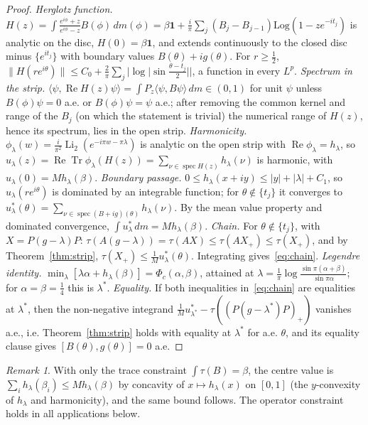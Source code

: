 \documentclass[11pt]{amsart}
\theoremstyle{definition}
\theoremstyle{remark}
\newtheorem{remark}[theorem]{Remark}
\numberwithin{equation}{section}
\newcommand{\Tr}{\operatorname{Tr}}
\newcommand{\spec}{\operatorname{spec}}
\newcommand{\Li}{\operatorname{Li}_2}
\newcommand{\one}{\mathbf{1}}
\renewcommand{\Re}{\operatorname{Re}}
\begin{document}
\begin{proof}
\emph{Herglotz function.} $H(z)=\int\frac{e^{i\phi}+z}{e^{i\phi}-z}B(\phi)\,dm(\phi)=\beta\one+\frac i\pi\sum_j(B_j-B_{j-1})
\mathrm{Log}(1-ze^{-it_j})$ is analytic on the disc, $H(0)=\beta\one$, and extends continuously to the closed disc minus
$\{e^{it_j}\}$ with boundary values $B(\theta)+ig(\theta)$. For $r\ge\frac12$,
$\|H(re^{i\theta})\|\le C_0+\frac2\pi\sum_j|\log|\sin\frac{\theta-t_j}2||$, a function in every $L^p$.
\emph{Spectrum in the strip.} $\langle\psi,\Re H(z)\psi\rangle=\int P_z\langle\psi,B\psi\rangle\,dm\in(0,1)$ for unit $\psi$
unless $B(\phi)\psi=0$ a.e. or $B(\phi)\psi=\psi$ a.e.; after removing the common kernel and range of the $B_j$ (on which
the statement is trivial) the numerical range of $H(z)$, hence its spectrum, lies in the open strip.
\emph{Harmonicity.} $\phi_\lambda(w)=\frac{i}{\pi^2}\Li(e^{-i\pi w-\pi\lambda})$ is analytic on the open strip with
$\Re\phi_\lambda=h_\lambda$, so $u_\lambda(z)=\Re\Tr\phi_\lambda(H(z))=\sum_{\nu\in\spec H(z)}h_\lambda(\nu)$ is harmonic,
with $u_\lambda(0)=Mh_\lambda(\beta)$.
\emph{Boundary passage.} $0\le h_\lambda(x+iy)\le|y|+|\lambda|+C_1$, so $u_\lambda(re^{i\theta})$ is dominated by an
integrable function; for $\theta\notin\{t_j\}$ it converges to $u^*_\lambda(\theta)=\sum_{\nu\in\spec(B+ig)(\theta)}h_\lambda(\nu)$.
By the mean value property and dominated convergence, $\int u^*_\lambda\,dm=Mh_\lambda(\beta)$.
\emph{Chain.} For $\theta\notin\{t_j\}$, with $X=P(g-\lambda)P$: $\tau(A(g-\lambda))=\tau(AX)\le\tau(AX_+)\le\tau(X_+)$, and
by Theorem~\ref{thm:strip}, $\tau(X_+)\le\frac1Mu^*_\lambda(\theta)$. Integrating gives~\eqref{eq:chain}.
\emph{Legendre identity.} $\min_\lambda[\lambda\alpha+h_\lambda(\beta)]=\Phi_c(\alpha,\beta)$, attained at
$\lambda=\frac1\pi\log\frac{\sin\pi(\alpha+\beta)}{\sin\pi\alpha}$; for $\alpha=\beta=\frac14$ this is $\lambda^*$.
\emph{Equality.} If both inequalities in~\eqref{eq:chain} are equalities at $\lambda^*$, then the non-negative integrand
$\frac1Mu^*_{\lambda^*}-\tau((P(g-\lambda^*)P)_+)$ vanishes a.e., i.e. Theorem~\ref{thm:strip} holds with equality at
$\lambda^*$ for a.e. $\theta$, and its equality clause gives $[B(\theta),g(\theta)]=0$ a.e.
\end{proof}

\begin{remark}
With only the trace constraint $\int\tau(B)=\beta$, the centre value is $\sum_ih_\lambda(\beta_i)\le Mh_\lambda(\beta)$
by concavity of $x\mapsto h_\lambda(x)$ on $[0,1]$ (the $y$-convexity of $h_\lambda$ and harmonicity), and the same
bound follows. The operator constraint holds in all applications below.
\end{remark}
\end{document}
